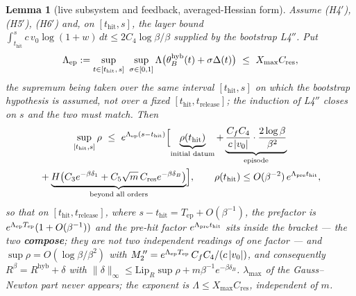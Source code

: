 \documentclass[11pt]{article}
\newtheorem{lemma}[theorem]{Lemma}
\theoremstyle{remark}
\newcommand{\thit}{t_{\mathrm{hit}}}
\newcommand{\trel}{t_{\mathrm{release}}}
\newcommand{\Tep}{T_{\mathrm{ep}}}
\newcommand{\hyb}{\mathrm{hyb}}
\newcommand{\Cres}{C_{\mathrm{res}}}
\newcommand{\Xmax}{X_{\max}}
\newcommand{\LipR}{\mathrm{Lip}_R}
\newcommand{\hyplabel}[1]{\textup{(#1)}}
\begin{document}
\begin{lemma}[live subsystem and feedback, averaged-Hessian form]\label{lem:L2}
Assume \hyplabel{H4$'$}, \hyplabel{H5$'$}, \hyplabel{H6$'$} and, on $[\thit,s]$,
the layer bound $\int_{\thit}^{s}c\,v_0\log(1+w)\,dt\le2C_4\log\beta/\beta$
supplied by the bootstrap L4$''$. Put
\begin{equation}\label{eq:Lamsup}
\Lambda_{\rm ep}:=\sup_{t\in[\thit,\,s]}\ \sup_{\sigma\in[0,1]}
\Lambda\bigl(\theta_B^{\hyb}(t)+\sigma\Delta(t)\bigr)\ \le\ \Xmax\Cres ,
\end{equation}
the supremum being taken over the \emph{same} interval $[\thit,s]$ on which the
bootstrap hypothesis is assumed, not over a fixed $[\thit,\trel]$; the induction
of L4$''$ closes on $s$ and the two must match. Then
\begin{multline}\label{eq:Brate}
\sup_{[\thit,s]}\rho
\ \le\ e^{\Lambda_{\rm ep}(s-\thit)}
\Bigl[\underbrace{\rho(\thit)}_{\text{initial datum}}
+\underbrace{\frac{C_fC_4}{c\,|v_0|}\cdot\frac{2\log\beta}{\beta^2}}_{\text{episode}}\\
{}+\underbrace{H\bigl(C_3e^{-\beta\delta_1}+C_5\sqrt m\,\Cres e^{-\beta\delta_B}\bigr)}_{\text{beyond all orders}}\Bigr],
\qquad
\rho(\thit)\le O(\beta^{-2})\,e^{\Lambda_{\rm pre}\thit},
\end{multline}
so that on $[\thit,\trel]$, where $s-\thit=\Tep+O(\beta^{-1})$, the prefactor is
$e^{\Lambda_{\rm ep}\Tep}(1+O(\beta^{-1}))$ and the pre-hit factor
$e^{\Lambda_{\rm pre}\thit}$ sits \emph{inside} the bracket --- the two
\textbf{compose}; they are not two independent readings of one factor ---
and $\sup\rho=O(\log\beta/\beta^2)$ with
$M_2^{\,\prime\prime}=e^{\Lambda_{\rm ep}\Tep}\,C_fC_4/(c\,|v_0|)$, and
consequently $R^\beta=R^{\hyb}+\delta$ with
$\|\delta\|_\infty\le\LipR\sup\rho+m\beta^{-1}e^{-\beta\delta_B}$.
\emph{$\lambda_{\max}$ of the Gauss--Newton part never appears; the exponent is
$\Lambda\le\Xmax\Cres$, independent of $m$.}
\end{lemma}
\end{document}
